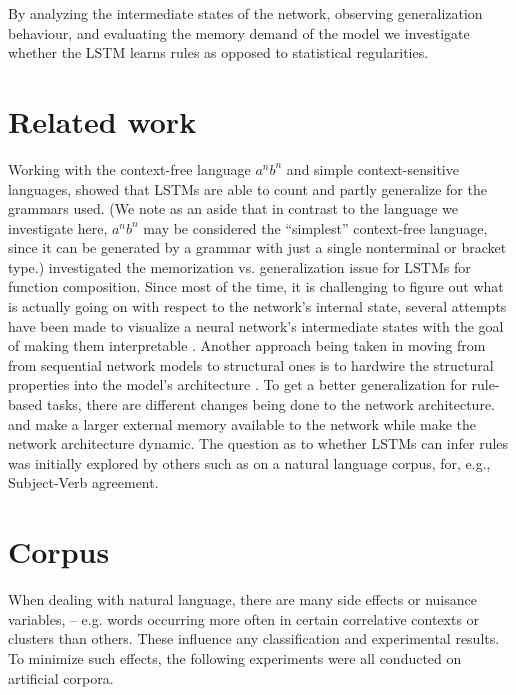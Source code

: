 \documentclass[11pt,a4paper]{article}
\begin{document}
By analyzing the intermediate states of the network, observing generalization behaviour, and evaluating the memory demand of the model we investigate whether the LSTM learns rules as opposed to statistical regularities.

\section{Related work}
Working with the context-free language $a^nb^n$ and simple context-sensitive languages, \citeauthor{gers2001lstm}  showed that LSTMs are able to count and partly generalize for the grammars used.  (We note as an aside that in contrast to the language we investigate here, $a^nb^n$ may be considered the ``simplest'' context-free language, since it can be generated by a grammar with just a single nonterminal or bracket type.)
\citeauthor{liska2018memorize}  investigated the memorization vs. generalization issue for LSTMs for function composition. Since most of the time, it is challenging to figure out what is actually going on with respect to the network's internal state, several attempts have been made to visualize a neural network's intermediate states \cite{rauber2017visualizing, karpathy2015visualizing} with the goal of making them interpretable \cite{krakovna2016increasing}.
Another approach being taken in moving from from sequential network models to structural ones is to hardwire the structural properties into the model's architecture \cite{tai2015improved, kiperwasser2016simple, joulin2015inferring}.
To get a better generalization for rule-based tasks, there are different changes being done to the network architecture. \citeauthor{graves2014neural}  and \citeauthor{sukhbaatar2015end}  make a larger external memory available to the network while \citeauthor{moshe2017deep}  make the network architecture dynamic.
The question as to whether LSTMs can infer rules was initially explored by others such as \cite{linzen2016assessing} on a natural language corpus, for, e.g., Subject-Verb agreement.

\section{Corpus}
\label{sec:corpus}
When dealing with natural language, there are many side effects  or nuisance variables,  -- e.g. words occurring more often in certain correlative contexts or clusters than others.  These influence any classification and experimental results. To minimize such effects, the following experiments were all conducted on artificial corpora.
\end{document}
